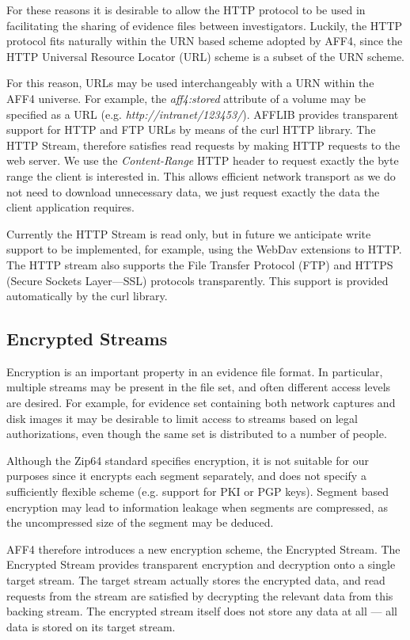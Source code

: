 \documentclass[10pt, conference]{IEEEtran}
\begin{document}
For these reasons it is desirable to allow the HTTP protocol to be
used in facilitating the sharing of evidence files between
investigators. Luckily, the HTTP protocol fits naturally within the
URN based scheme adopted by AFF4, since the HTTP Universal Resource
Locator (URL) scheme is a subset of the URN scheme.

For this reason, URLs may be used interchangeably with a URN within
the AFF4 universe. For example, the \emph{aff4:stored} attribute of a
volume may be specified as a URL
(e.g. \emph{http://intranet/123453/}).  AFFLIB provides transparent
support for HTTP and FTP URLs by means of the curl HTTP
library\cite{libcurl}. The HTTP Stream, therefore satisfies read
requests by making HTTP requests to the web server. We use the
\emph{Content-Range} HTTP header to request exactly the byte range the
client is interested in. This allows efficient network transport as we
do not need to download unnecessary data, we just request exactly the
data the client application requires.

Currently the HTTP Stream is read only, but in future we anticipate
write support to be implemented, for example, using the WebDav
extensions to HTTP\cite{webdav-rfc}. The HTTP stream also supports the
File Transfer Protocol (FTP) and HTTPS (Secure Sockets Layer---SSL)
protocols transparently. This support is provided automatically by the
curl library.

\subsection{Encrypted Streams}
\label{crypted_stream}
Encryption is an important property in an evidence file format. In
particular, multiple streams may be present in the file set, and often
different access levels are desired. For example, for evidence set
containing both network captures and disk images it may be desirable
to limit access to streams based on legal authorizations, even though
the same set is distributed to a number of people.

Although the Zip64 standard specifies encryption, it is not suitable
for our purposes since it encrypts each segment separately, and does
not specify a sufficiently flexible scheme (e.g. support for PKI or
PGP keys). Segment based encryption may lead to information leakage
when segments are compressed, as the uncompressed size of the segment
may be deduced.

AFF4 therefore introduces a new encryption scheme, the Encrypted
Stream.  The Encrypted Stream provides transparent encryption and
decryption onto a single target stream. The target stream actually
stores the encrypted data, and read requests from the stream are
satisfied by decrypting the relevant data from this backing
stream. The encrypted stream itself does not store any data at all ---
all data is stored on its target stream.
\end{document}
